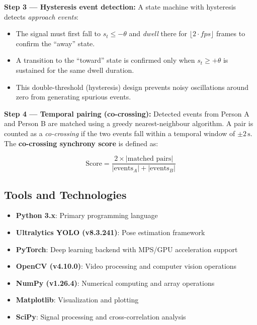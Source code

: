 \documentclass[11pt]{article}
\begin{document}
\vspace{0.5em}
\noindent\textbf{Step 3 — Hysteresis event detection:} A state machine with hysteresis detects \textit{approach events}:
\begin{itemize}
    \item The signal must first fall to $s_t \leq -\theta$ and \textit{dwell} there for $\lfloor 2 \cdot fps \rfloor$ frames to confirm the ``away'' state.
    \item A transition to the ``toward'' state is confirmed only when $s_t \geq +\theta$ is sustained for the same dwell duration.
    \item This double-threshold (hysteresis) design prevents noisy oscillations around zero from generating spurious events.
\end{itemize}

\vspace{0.5em}
\noindent\textbf{Step 4 — Temporal pairing (co-crossing):} Detected events from Person A and Person B are matched using a greedy nearest-neighbour algorithm. A pair is counted as a \textit{co-crossing} if the two events fall within a temporal window of $\pm 2\,\text{s}$. The \textbf{co-crossing synchrony score} is defined as:

\begin{equation}
    \text{Score} = \frac{2 \times |\text{matched pairs}|}{|\text{events}_A| + |\text{events}_B|}
\end{equation}

\subsection{Tools and Technologies}
\begin{itemize}
    \item \textbf{Python 3.x}: Primary programming language
    \item \textbf{Ultralytics YOLO (v8.3.241)}: Pose estimation framework
    \item \textbf{PyTorch}: Deep learning backend with MPS/GPU acceleration support
    \item \textbf{OpenCV (v4.10.0)}: Video processing and computer vision operations
    \item \textbf{NumPy (v1.26.4)}: Numerical computing and array operations
    \item \textbf{Matplotlib}: Visualization and plotting
    \item \textbf{SciPy}: Signal processing and cross-correlation analysis
\end{itemize}
\end{document}
